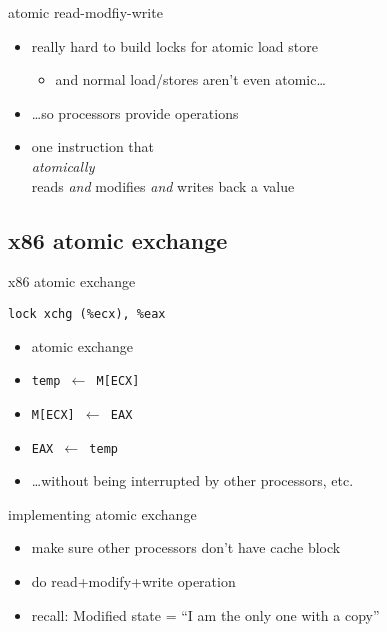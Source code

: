\begin{frame}{atomic read-modfiy-write}
    \begin{itemize}
    \item really hard to build locks for atomic load store
        \begin{itemize}
        \item and normal load/stores aren't even atomic\ldots
        \end{itemize}
    \item \ldots so processors provide  operations
        \vspace{.5cm}
    \item one instruction that\\\textit{atomically}\\reads \textit{and} modifies \textit{and} writes back a value
    \end{itemize}
\end{frame}

\subsection{x86 atomic exchange} 
\begin{frame}[fragile,label=atomicXchg]{x86 atomic exchange}
\begin{lstlisting}[language=myasm]
lock xchg (%ecx), %eax
\end{lstlisting}
\begin{itemize}
    \item atomic exchange
    \item \texttt{temp $\leftarrow$ M[ECX]}
    \item \texttt{M[ECX] $\leftarrow$ EAX}
    \item \texttt{EAX $\leftarrow$ temp}
    \item \ldots without being interrupted by other processors, etc.
\end{itemize}
\end{frame}


\begin{frame}{implementing atomic exchange}
    \begin{itemize}
    \item make sure other processors don't have cache block
    \item do read+modify+write operation
    \vspace{.5cm}
    \item recall: Modified state = ``I am the only one with a copy''
    \end{itemize}
\end{frame}

